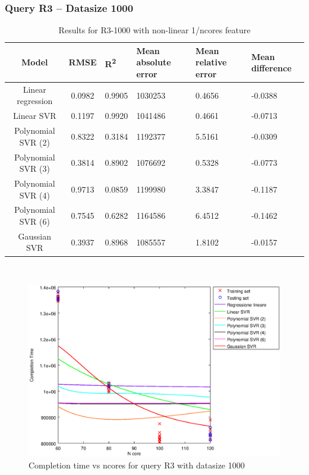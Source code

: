 \documentclass[a4paper,11pt]{article}
\begin{document}
\newpage
\subsubsection{Query R3 -- Datasize 1000}
\begin{table}[H]
	\centering
	\begin{adjustbox}{center}
		\begin{tabular}{c | c M{1.2cm} M{2.5cm} M{2.5cm} M{1.8cm}}
			Model & RMSE & R\textsuperscript{2} & Mean absolute error & Mean relative error & Mean difference \tabularnewline
			\hline
			Linear regression & 0.0982 & 0.9905 & 1030253 & 0.4656 & -0.0388 \\
			Linear SVR & 0.1197 & 0.9920 & 1041486 & 0.4661 & -0.0713 \\
			Polynomial SVR (2) & 0.8322 & 0.3184 & 1192377 & 5.5161 & -0.0309 \\
			Polynomial SVR (3) & 0.3814 & 0.8902 & 1076692 & 0.5328 & -0.0773 \\
			Polynomial SVR (4) & 0.9713 & 0.0859 & 1199980 & 3.3847 & -0.1187 \\
			Polynomial SVR (6) & 0.7545 & 0.6282 & 1164586 & 6.4512 & -0.1462 \\
			Gaussian SVR & 0.3937 & 0.8968 & 1085557 & 1.8102 & -0.0157 \\
		\end{tabular}
	\end{adjustbox}
	\\
	\caption{Results for R3-1000 with non-linear 1/ncores feature}
	\label{table_R3_prediction_all}
\end{table}

\begin {figure}[hbtp]
\centering
\includegraphics[width=\textwidth]{output/R3_1000_1_OVER_NCORES/plot_R3_1000.eps}
\caption {Completion time vs ncores for query R3 with datasize 1000}
\end {figure}
\end{document}
